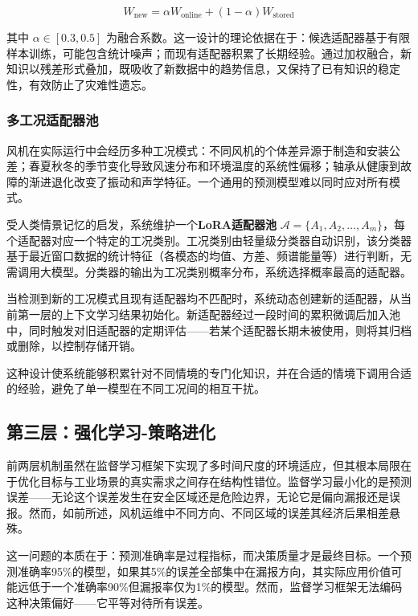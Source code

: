 \documentclass[12pt,a4paper]{article}
\begin{document}
\begin{equation}
W_{\text{new}} = \alpha W_{\text{online}} + (1 - \alpha) W_{\text{stored}}
\end{equation}

其中 $\alpha \in [0.3, 0.5]$ 为融合系数。这一设计的理论依据在于：候选适配器基于有限样本训练，可能包含统计噪声；而现有适配器积累了长期经验。通过加权融合，新知识以残差形式叠加，既吸收了新数据中的趋势信息，又保持了已有知识的稳定性，有效防止了灾难性遗忘。

\subsubsection{多工况适配器池}

风机在实际运行中会经历多种工况模式：不同风机的个体差异源于制造和安装公差；春夏秋冬的季节变化导致风速分布和环境温度的系统性偏移；轴承从健康到故障的渐进退化改变了振动和声学特征。一个通用的预测模型难以同时应对所有模式。

受人类情景记忆的启发，系统维护一个\textbf{LoRA适配器池} $\mathcal{A} = \{A_1, A_2, \ldots, A_m\}$，每个适配器对应一个特定的工况类别。工况类别由轻量级分类器自动识别，该分类器基于最近窗口数据的统计特征（各模态的均值、方差、频谱能量等）进行判断，无需调用大模型。分类器的输出为工况类别概率分布，系统选择概率最高的适配器。

当检测到新的工况模式且现有适配器均不匹配时，系统动态创建新的适配器，从当前第一层的上下文学习结果初始化。新适配器经过一段时间的累积微调后加入池中，同时触发对旧适配器的定期评估——若某个适配器长期未被使用，则将其归档或删除，以控制存储开销。

这种设计使系统能够积累针对不同情境的专门化知识，并在合适的情境下调用合适的经验，避免了单一模型在不同工况间的相互干扰。

\subsection{第三层：强化学习-策略进化}

前两层机制虽然在监督学习框架下实现了多时间尺度的环境适应，但其根本局限在于优化目标与工业场景的真实需求之间存在结构性错位。监督学习最小化的是预测误差——无论这个误差发生在安全区域还是危险边界，无论它是偏向漏报还是误报。然而，如前所述，风机运维中不同方向、不同区域的误差其经济后果相差悬殊。

这一问题的本质在于：预测准确率是过程指标，而决策质量才是最终目标。一个预测准确率95\%的模型，如果其5\%的误差全部集中在漏报方向，其实际应用价值可能远低于一个准确率90\%但漏报率仅为1\%的模型。然而，监督学习框架无法编码这种决策偏好——它平等对待所有误差。
\end{document}
